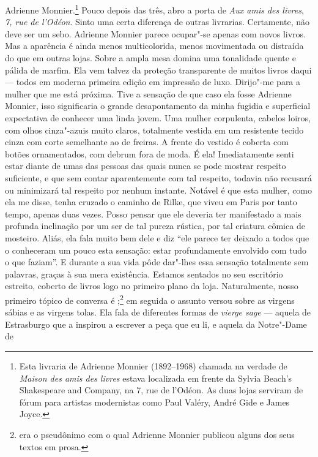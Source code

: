 Adrienne Monnier.\footnote{Esta livraria de
  Adrienne Monnier (1892--1968) chamada na verdade de \emph{Maison des
  amis des livres} estava localizada em frente da Sylvia Beach's
  Shakespeare and Company, na 7, rue de l'Odéon. As duas lojas serviram
  de fórum para artistas modernistas como Paul Valéry, André Gide e
  James Joyce. \versal{[N.~O.]}} Pouco depois das três, abro a porta de \emph{Aux amis
des livres}, \emph{7, rue de l'Odéon}. Sinto uma certa diferença de
outras livrarias. Certamente, não deve ser um sebo. Adrienne Monnier
parece ocupar"-se apenas com novos livros. Mas a aparência é ainda menos
multicolorida, menos movimentada ou distraída do que em outras lojas.
Sobre a ampla mesa domina uma tonalidade quente e pálida de marfim. Ela
vem talvez da proteção transparente de muitos livros daqui --- todos em
moderna primeira edição em impressão de luxo. Dirijo"-me para a mulher que me está próxima. Tive a sensação de que caso ela fosse Adrienne Monnier, isso significaria o grande desapontamento da minha fugidia e superficial expectativa de conhecer uma linda jovem. Uma mulher corpulenta, cabelos
loiros, com olhos cinza"-azuis muito claros, totalmente vestida em um
resistente tecido cinza com corte semelhante ao de freiras. A frente do
vestido é coberta com botões ornamentados, com debrum fora de moda. É
ela! Imediatamente senti estar diante de umas das pessoas das quais
nunca se pode mostrar respeito suficiente, e que sem contar
aparentemente com tal respeito, todavia não recusará ou minimizará tal
respeito por nenhum instante. Notável é que esta mulher, como ela me
disse, tenha cruzado o caminho de Rilke, que viveu em Paris por tanto
tempo, apenas duas vezes. Posso pensar que ele deveria ter manifestado a
mais profunda inclinação por um ser de tal pureza rústica, por tal
criatura cômica de mosteiro. Aliás, ela fala muito bem dele e diz ``ele
parece ter deixado a todos que o conheceram um pouco esta sensação:
estar profundamente envolvido com tudo o que faziam''. E durante a sua
vida pôde dar"-lhes essa sensação totalmente sem palavras, graças à sua
mera existência. Estamos sentados no seu escritório estreito, coberto de
livros logo no primeiro plano da loja. Naturalmente, nosso primeiro
tópico de conversa é ;\footnote{ era o pseudônimo com o
  qual Adrienne Monnier publicou alguns dos seus textos em prosa. \versal{[N.~O.]}} em
seguida o assunto versou sobre as virgens sábias e as virgens tolas. Ela
fala de diferentes formas de \emph{vierge sage} --- aquela de Estrasburgo
que a inspirou a escrever a peça que eu li, e aquela da Notre"-Dame de
